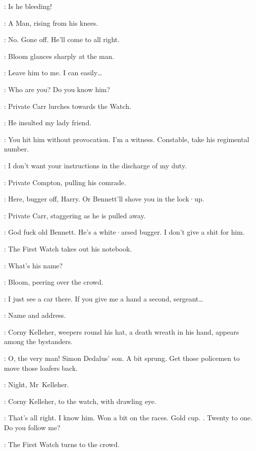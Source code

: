 \Cissy:
Is he bleeding!

:
A Man,
rising from his knees.

:
No.
Gone off.
He'll come to all right.

:
Bloom glances sharply at the man.

\Bloom:
Leave him to me.
I can easily…

\SecondWatch[8b]:
Who are you?
Do you know him?

:
Private Carr lurches towards the Watch.

\Carr:
He insulted my lady friend.

\Bloom:
You hit him without provocation.
I'm a witness.
Constable,
take his regimental number.

\SecondWatch[8b]:
I don't want your instructions in the discharge of my duty.

:
Private Compton,
pulling his comrade.

\Compton:
Here,
bugger off,
Harry.
Or Bennett'll shove you in the lock·up.

:
Private Carr,
staggering as he is pulled away.

\Carr:
God fuck old Bennett.
He's a white·arsed bugger.
I don't give a shit for him.

:
The First Watch takes out his notebook.

\FirstWatch:
What's his name?

:
Bloom,
peering over the crowd.

\Bloom:
I just see a car there.
If you give me a hand a second,
sergeant…

\FirstWatch:
Name and address.

:
Corny Kelleher,
weepers round his hat,
a death wreath in his hand,
appears among the bystanders.

\Bloom:
O,
the very man!
Simon Dedalus' son.
A bit sprung.
Get those policemen to move those loafers back.

\SecondWatch[8b]:
Night,
Mr~Kelleher.

:
Corny Kelleher,
to the watch,
with drawling eye.

\Corny:
That's all right.
I know him.
Won a bit on the races.
Gold cup.
.
Twenty to one.
Do you follow me?

:
The First Watch turns to the crowd.

